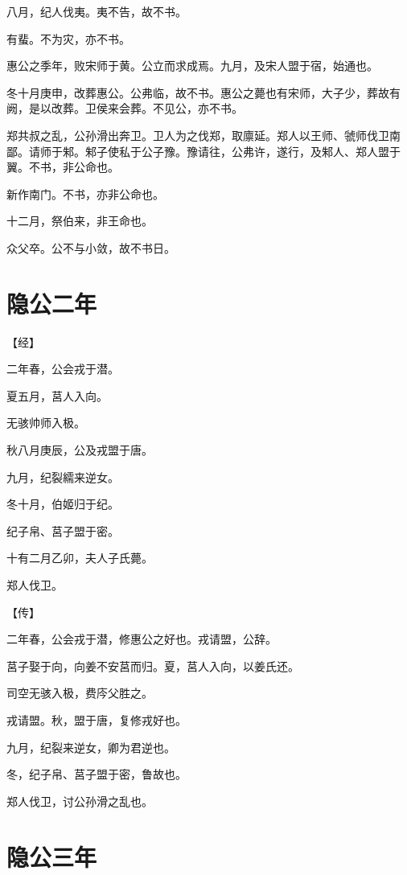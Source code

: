 \documentclass[a4paper,12pt,UTF8,twoside]{ctexbook}
\begin{document}
八月，纪人伐夷。夷不告，故不书。

有蜚。不为灾，亦不书。

惠公之季年，败宋师于黄。公立而求成焉。九月，及宋人盟于宿，始通也。

冬十月庚申，改葬惠公。公弗临，故不书。惠公之薨也有宋师，大子少，葬故有阙，是以改葬。卫侯来会葬。不见公，亦不书。

郑共叔之乱，公孙滑出奔卫。卫人为之伐郑，取廪延。郑人以王师、虢师伐卫南鄙。请师于邾。邾子使私于公子豫。豫请往，公弗许，遂行，及邾人、郑人盟于翼。不书，非公命也。

新作南门。不书，亦非公命也。

十二月，祭伯来，非王命也。

众父卒。公不与小敛，故不书日。

\section{隐公二年}

【经】

二年春，公会戎于潜。

夏五月，莒人入向。

无骇帅师入极。

秋八月庚辰，公及戎盟于唐。

九月，纪裂繻来逆女。

冬十月，伯姬归于纪。

纪子帛、莒子盟于密。

十有二月乙卯，夫人子氏薨。

郑人伐卫。

【传】

二年春，公会戎于潜，修惠公之好也。戎请盟，公辞。

莒子娶于向，向姜不安莒而归。夏，莒人入向，以姜氏还。

司空无骇入极，费庈父胜之。

戎请盟。秋，盟于唐，复修戎好也。

九月，纪裂来逆女，卿为君逆也。

冬，纪子帛、莒子盟于密，鲁故也。

郑人伐卫，讨公孙滑之乱也。

\section{隐公三年}
\end{document}

